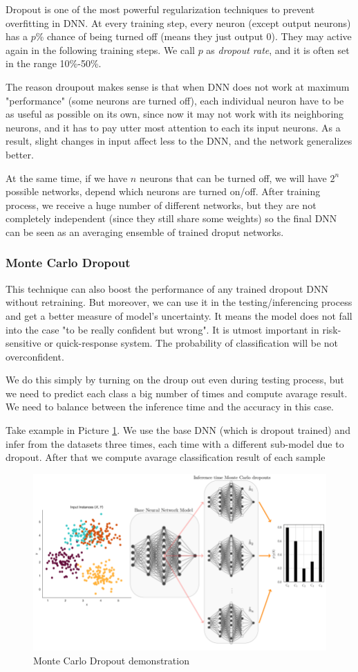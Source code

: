 Dropout is one of the most powerful regularization techniques to prevent overfitting in DNN. At every training step, every neuron (except output neurons) has a $p$\% chance of being turned off (means they just output 0). They may active again in the following training steps. We call $p$ as \emph{dropout rate}, and it is often set in the range 10\%-50\%.

The reason droupout makes sense is that when DNN does not work at maximum "performance" (some neurons are turned off), each individual neuron have to be as useful as possible on its own, since now it may not work with its neighboring neurons, and it has to pay utter most attention to each its input neurons. As a result, slight changes in input affect less to the DNN, and the network generalizes better.

At the same time, if we have $n$ neurons that can be turned off, we will have $2^n$ possible networks, depend which neurons are turned on/off. After training process, we receive a huge number of different networks, but they are not completely independent (since they still share some weights) so the final DNN can be seen as an averaging ensemble of trained droput networks.

\subsubsection*{Monte Carlo Dropout}

This technique can also boost the performance of any trained dropout DNN without retraining. But moreover, we can use it in the testing/inferencing process and get a better measure of model's uncertainty. It means the model does not fall into the case "to be really confident but wrong". It is utmost important in risk-sensitive or quick-response system. The probability of classification will be not overconfident.

We do this simply by turning on the droup out even during testing process, but we need to predict each class a big number of times and compute avarage result. We need to balance between the inference time and the accuracy in this case.

Take example in Picture \ref{fig:DNN1}. We use the base DNN (which is dropout trained) and infer from the datasets three times, each time with a different sub-model due to dropout. After that we compute avarage classification result of each sample   

\begin{figure}[th!]
	\includegraphics[scale=0.5]{./Images/MCDropout}
	\caption{Monte Carlo Dropout demonstration}
	\label{fig:DNN1}
\end{figure} 
